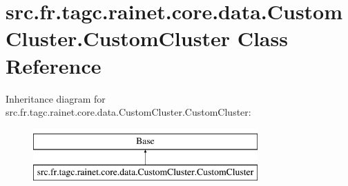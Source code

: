 \hypertarget{classsrc_1_1fr_1_1tagc_1_1rainet_1_1core_1_1data_1_1CustomCluster_1_1CustomCluster}{\section{src.\-fr.\-tagc.\-rainet.\-core.\-data.\-Custom\-Cluster.\-Custom\-Cluster Class Reference}
\label{classsrc_1_1fr_1_1tagc_1_1rainet_1_1core_1_1data_1_1CustomCluster_1_1CustomCluster}
}
Inheritance diagram for src.\-fr.\-tagc.\-rainet.\-core.\-data.\-Custom\-Cluster.\-Custom\-Cluster\-:\begin{figure}[H]
\begin{center}
\leavevmode
\includegraphics[height=2.000000cm]{classsrc_1_1fr_1_1tagc_1_1rainet_1_1core_1_1data_1_1CustomCluster_1_1CustomCluster}
\end{center}
\end{figure}
